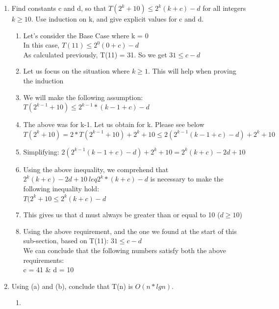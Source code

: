\documentclass[11pt]{article}
\begin{document}
\begin{enumerate}
\begin{enumerate}
        \item Find constants c and d, so that $T(2^k+10) \leq 2^k(k+c)-d$ for all integers $k \geq 10$. Use induction on k, and give explicit values for c and d.
        \begin{enumerate}
            \item Let's consider the Base Case where k = 0\\
            In this case, $T(11) \leq 2^0(0+c) - d$\\
            As calculated previously, T(11) = 31. So we get $31 \leq c-d$
            \item Let us focus on the situation where $k \geq 1$. This will help when proving the induction
            \item We will make the following assumption:\\
            $T(2^{k-1} + 10) \leq 2^{k-1} * (k-1+c)-d$
            \item The above was for k-1. Let us obtain for k. Please see below\\
            $T(2^k + 10) = 2 * T(2^{k-1} + 10) + 2^k + 10 \leq 2(2^{k-1}(k-1 + c)-d)+2^k + 10$
            \item Simplifying: 
            $2(2^{k-1}(k-1 + c)-d)+2^k + 10 =2^k(k+c)-2d+10$
            \item Using the above inequality, we comprehend that $2^k(k+c)-2d+10 \ leq 2^k*(k+c)-d$ is necessary to make the following inequality hold:\\
            $T(2^k+10 \leq 2^k(k+c)-d$
            \item This gives us that d must always be greater than or equal to 10 ($d \geq 10$)
            \item Using the above requirement, and the one we found at the start of this sub-section, based on T(11): $31 \leq c-d$\\
            We can conclude that the following numbers satisfy both the above requirements:\\
            c = 41 & d = 10
        \end{enumerate}

        \item Using (a) and (b), conclude that T(n) is $O(n* lg n)$.
        \begin{enumerate}
            \item 
        \end{enumerate}
        

\end{enumerate}
\end{enumerate}
\end{document}
